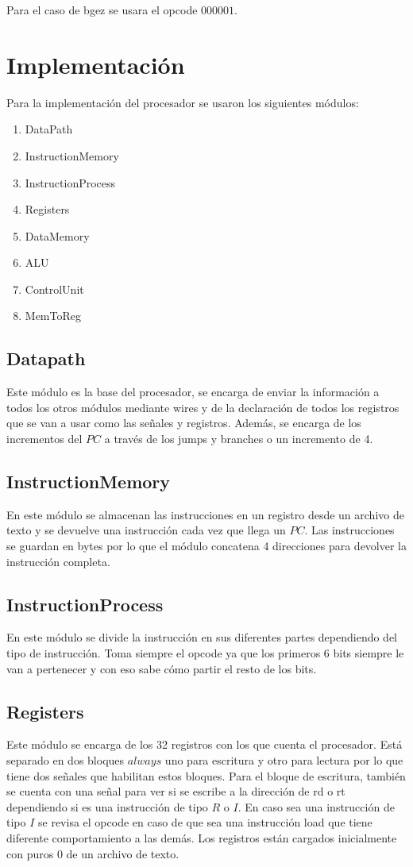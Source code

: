 \documentclass[12pt,a4paper]{article}
\begin{document}
Para el caso de bgez se usara el opcode $000001$.


\section{Implementación}
Para la implementación del procesador se usaron los siguientes módulos:
\begin{enumerate}
\item DataPath
\item InstructionMemory
\item InstructionProcess
\item Registers
\item DataMemory
\item ALU
\item ControlUnit
\item MemToReg
\end{enumerate}

\subsection{Datapath}
\text Este módulo es la base del procesador, se encarga de enviar la información a todos los otros módulos mediante wires y de la declaración de todos los registros que se van a usar como las señales y registros. Además, se encarga de los incrementos del $PC$ a través de los jumps y branches o un incremento de 4.

\subsection{InstructionMemory}
\text En este módulo se almacenan las instrucciones en un registro desde un archivo de texto y se devuelve una instrucción cada vez
que llega un $PC$. Las instrucciones se guardan en bytes por lo que el módulo concatena 4 direcciones para devolver la instrucción completa.

\subsection{InstructionProcess}
\text En este módulo se divide la instrucción en sus diferentes partes dependiendo del tipo de instrucción. Toma siempre el opcode ya que los primeros 6 bits siempre le van a pertenecer y con eso sabe cómo partir el resto de los bits.

\subsection{Registers}
\text Este módulo se encarga de los 32 registros con los que cuenta el procesador. Está separado en dos bloques $always$ uno para escritura y otro para lectura por lo que tiene dos señales que habilitan estos bloques. Para el bloque de escritura, también se cuenta con una señal para ver si se escribe a la dirección de rd o rt dependiendo si es una instrucción de tipo $R$ o $I$. En caso sea una instrucción de tipo $I$ se revisa el opcode en caso de que sea una instrucción load que tiene diferente comportamiento a las demás. Los registros están cargados inicialmente con puros $0$ de un archivo de texto.
\end{document}
